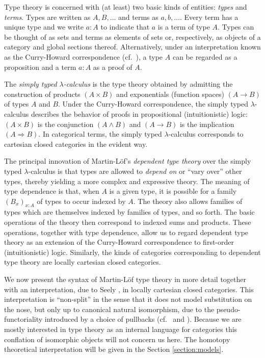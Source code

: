 \documentclass{amsart}
\renewcommand{\implies}{\Rightarrow}
\theoremstyle{definition}
\theoremstyle{remark}
\begin{document}
Type theory is concerned with (at least) two basic kinds of
entities: \emph{types} and \emph{terms}.  Types are
written as $A,B,\ldots$ and terms as $a,b,\ldots$.  Every
term has a unique type and we write $a:A$ to indicate that $a$ is a
term of type $A$.  Types can be thought of as sets and terms as
elements of sets or, respectively, as objects of a category and global sections
thereof.  Alternatively, under an interpretation known as the
Curry-Howard correspondence (cf.~\cite{Nordstrom:PMLTT}), a type $A$ can be
regarded as a proposition and a term $a:A$ as a proof of $A$.  

The \emph{simply typed $\lambda$-calculus} is the type theory obtained
by admitting the construction of products $(A\times B)$ and
exponentials (function
spaces) $(A\rightarrow B)$ of types $A$ and $B$.  Under the
Curry-Howard correspondence, the simply typed $\lambda$-calculus
describes the behavior of proofs in propositional (intuitionistic) logic:
$(A\times B)$ is the conjunction $(A\wedge B)$ and $(A\rightarrow
B)$ is the implication $(A\implies B)$.
In categorical terms, the simply typed $\lambda$-calculus corresponds
to cartesian closed categories in the evident way.

The principal innovation of Martin-L\"{o}f's \emph{dependent type theory}
over the simply typed $\lambda$-calculus is that types are allowed to
\emph{depend on} or ``vary over'' other types, thereby yielding a
more complex and expressive theory.  The meaning of type
dependence is that, when $A$ is a given type, it is possible for a family
$(B_{x})_{x:A}$ of types to occur indexed by $A$.  The theory also allows
families of types which are themselves indexed by families of types,
and so forth.  The basic operations of the theory then correspond to
indexed sums and products.  These operations, together with type
dependence, allow us to regard dependent type theory as an extension
of the Curry-Howard correspondence to first-order (intuitionistic)
logic.  Similarly, the kinds of categories corresponding to dependent
type theory are locally cartesian closed categories.

We now present the syntax of Martin-L\"{o}f type theory in more
detail together with an interpretation, due to Seely
\cite{Seely:LCCCTT}, in locally cartesian closed categories.  This
interpretation is ``non-split'' in the sense that it does not model
substitution on the nose, but only up to canonical natural
isomorphism, due to the pseudo-functoriality introduced by a choice of
pullbacks (cf.~\cite{Curien:SUI} and \cite{Hofmann:OITTLCCC}).
Because we are mostly interested in type theory as an internal
language for categories this conflation of isomorphic objects will not
concern us here.  The homotopy theoretical interpretation will be
given in the Section \ref{section:models}.
\end{document}
